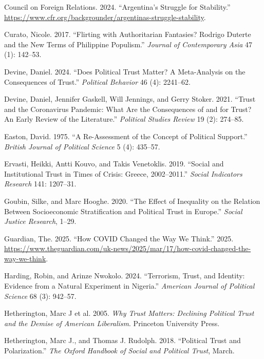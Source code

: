 \documentclass[
  12pt,
]{article}
\newlength{\cslhangindent}
\newenvironment{CSLReferences}[2] %
 {\begin{list}{}{%
  \setlength{\itemindent}{0pt}
  \setlength{\leftmargin}{0pt}
  \setlength{\parsep}{0pt}
  \ifodd #1
   \setlength{\leftmargin}{\cslhangindent}
   \setlength{\itemindent}{-1\cslhangindent}
  \fi
  \setlength{\itemsep}{#2\baselineskip}}}
 {\end{list}}
\begin{document}
\begin{CSLReferences}{1}{0}
Council on Foreign Relations. 2024. {``Argentina's Struggle for Stability.''} \url{https://www.cfr.org/backgrounder/argentinas-struggle-stability}.

Curato, Nicole. 2017. {``Flirting with Authoritarian Fantasies? Rodrigo Duterte and the New Terms of Philippine Populism.''} \emph{Journal of Contemporary Asia} 47 (1): 142--53.

Devine, Daniel. 2024. {``Does Political Trust Matter? A Meta-Analysis on the Consequences of Trust.''} \emph{Political Behavior} 46 (4): 2241--62.

Devine, Daniel, Jennifer Gaskell, Will Jennings, and Gerry Stoker. 2021. {``Trust and the Coronavirus Pandemic: What Are the Consequences of and for Trust? An Early Review of the Literature.''} \emph{Political Studies Review} 19 (2): 274--85.

Easton, David. 1975. {``A Re-Assessment of the Concept of Political Support.''} \emph{British Journal of Political Science} 5 (4): 435--57.

Ervasti, Heikki, Antti Kouvo, and Takis Venetoklis. 2019. {``Social and Institutional Trust in Times of Crisis: Greece, 2002--2011.''} \emph{Social Indicators Research} 141: 1207--31.

Goubin, Silke, and Marc Hooghe. 2020. {``The Effect of Inequality on the Relation Between Socioeconomic Stratification and Political Trust in Europe.''} \emph{Social Justice Research}, 1--29.

Guardian, The. 2025. {``How COVID Changed the Way We Think.''} 2025. \url{https://www.theguardian.com/uk-news/2025/mar/17/how-covid-changed-the-way-we-think}.

Harding, Robin, and Arinze Nwokolo. 2024. {``Terrorism, Trust, and Identity: Evidence from a Natural Experiment in Nigeria.''} \emph{American Journal of Political Science} 68 (3): 942--57.

Hetherington, Marc J et al. 2005. \emph{Why Trust Matters: Declining Political Trust and the Demise of American Liberalism}. Princeton University Press.

Hetherington, Marc J., and Thomas J. Rudolph. 2018. {``Political {Trust} and {Polarization}.''} \emph{The Oxford Handbook of Social and Political Trust}, March.


\end{CSLReferences}
\end{document}
